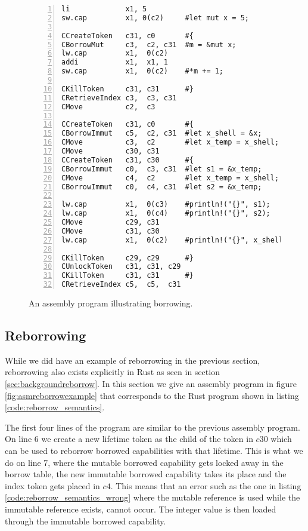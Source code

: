 \begin{figure}[h]
\begin{lstlisting}[style=custASM, numbers = left ,xleftmargin=1.5em]
li             x1, 5
sw.cap         x1, 0(c2)     #let mut x = 5;

CCreateToken   c31, c0       #{
CBorrowMut     c3,  c2, c31  #m = &mut x;
lw.cap         x1,  0(c2)
addi           x1,  x1, 1
sw.cap         x1,  0(c2)    #*m += 1;

CKillToken     c31, c31      #}
CRetrieveIndex c3,  c3, c31
CMove          c2,  c3

CCreateToken   c31, c0       #{
CBorrowImmut   c5,  c2, c31  #let x_shell = &x;
CMove          c3,  c2       #let x_temp = x_shell;
CMove          c30, c31
CCreateToken   c31, c30      #{
CBorrowImmut   c0,  c3, c31  #let s1 = &x_temp;
CMove          c4,  c2       #let x_temp = x_shell;
CBorrowImmut   c0,  c4, c31  #let s2 = &x_temp;

lw.cap         x1,  0(c3)    #println!("{}", s1);
lw.cap         x1,  0(c4)    #println!("{}", s2);
CMove          c29, c31
CMove          c31, c30
lw.cap         x1,  0(c2)    #println!("{}", x_shell);

CKillToken     c29, c29      #}
CUnlockToken   c31, c31, c29
CKillToken     c31, c31      #}
CRetrieveIndex c5,  c5,  c31
\end{lstlisting}
\caption{An assembly program illustrating borrowing.}
\label{fig:asmborrowexample}
\end{figure}

\subsection{Reborrowing}
While we did have an example of reborrowing in the previous section, reborrowing also exists explicitly in Rust as seen in section \ref{sec:backgroundreborrow}.
In this section we give an assembly program in figure \ref{fig:asmreborrowexample} that corresponds to the Rust program shown in listing \ref{code:reborrow_semantics}.

The first four lines of the program are similar to the previous assembly program.
On line 6 we create a new lifetime token as the child of the token in $c30$ which can be used to reborrow borrowed capabilities with that lifetime.
This is what we do on line 7, where the mutable borrowed capability gets locked away in the borrow table, the new immutable borrowed capability takes its place and the index token gets placed in $c4$.
This means that an error such as the one in listing \ref{code:reborrow_semantics_wrong} where the mutable reference is used while the immutable reference exists, cannot occur.
The integer value is then loaded through the immutable borrowed capability.

